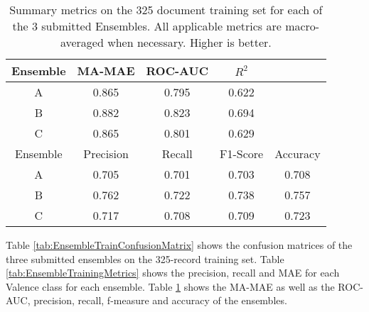 \begin{table}
\centering
    \begin{tabular}{|c|c|c|c|c|}
         \hline
         \textsf{ Ensemble } & \textsf{ MA-MAE } & \textsf{ ROC-AUC } & \textsf{ $R^2$ } & \\
         \hline
         \textsf{ \cellcolor{gray!15} A } & 0.865 & 0.795 & 0.622 & \\
         \textsf{ \cellcolor{gray!15} B } & \cellcolor{gray!15} 0.882 & \cellcolor{gray!15} 0.823 & \cellcolor{gray!15} 0.694 & \\ 
         \textsf{ \cellcolor{gray!15} C } & 0.865 & 0.801 & 0.629 & \\ 
         \hline
         \textsf{ Ensemble } & \textsf{ Precision } & \textsf{ Recall } & \textsf{ F1-Score } & \textsf{ Accuracy } \\ 
         \hline
         \textsf{ \cellcolor{gray!15} A } & 0.705 & 0.701 & 0.703 & 0.708 \\
         \textsf{ \cellcolor{gray!15} B } & \cellcolor{gray!15} 0.762 & \cellcolor{gray!15} 0.722 & \cellcolor{gray!15} 0.738 & \cellcolor{gray!15} 0.757 \\ 
         \textsf{ \cellcolor{gray!15} C } & 0.717 & 0.708 & 0.709 & 0.723 \\ 
         \hline
    \end{tabular}
    \caption{Summary metrics on the 325 document training set for each of the 3 submitted Ensembles. All applicable metrics are macro-averaged when necessary. Higher is better.}
    \label{tab:EnsembleTrainingMAMetrics2}
\end{table}

Table \ref{tab:EnsembleTrainConfusionMatrix} shows
the confusion matrices of the three submitted ensembles
on the 325-record training set. Table \ref{tab:EnsembleTrainingMetrics}
shows the precision, recall and \textsf{MAE} for each \textsf{Valence}
class for each ensemble.  Table \ref{tab:EnsembleTrainingMAMetrics2}
shows the \textsf{MA-MAE} as well as the ROC-AUC, 
precision, recall, f-measure and accuracy of the ensembles.




